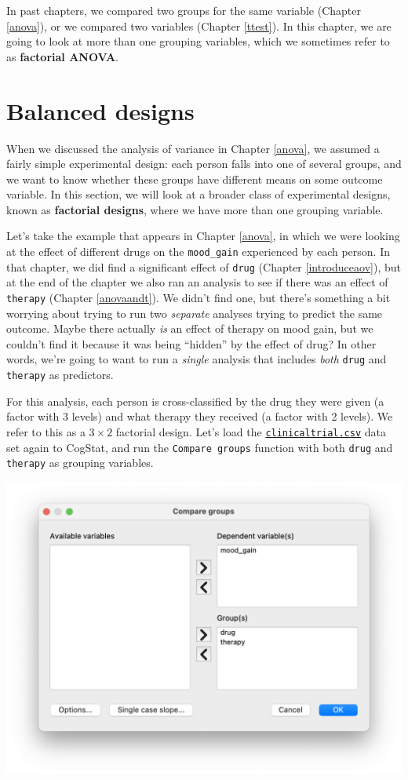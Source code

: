 \documentclass[
]{book}
\theoremstyle{definition}
\theoremstyle{definition}
\theoremstyle{definition}
\theoremstyle{definition}
\theoremstyle{remark}
\begin{document}
In past chapters, we compared two groups for the same variable (Chapter \ref{anova}), or we compared two variables (Chapter \ref{ttest}). In this chapter, we are going to look at more than one grouping variables, which we sometimes refer to as \textbf{factorial ANOVA}.

\hypertarget{factorialanovasimple}{%
\section{Balanced designs}\label{factorialanovasimple}}

When we discussed the analysis of variance in Chapter \ref{anova}, we assumed a fairly simple experimental design: each person falls into one of several groups, and we want to know whether these groups have different means on some outcome variable. In this section, we will look at a broader class of experimental designs, known as \textbf{factorial designs}, where we have more than one grouping variable.

Let's take the example that appears in Chapter \ref{anova}, in which we were looking at the effect of different drugs on the \texttt{mood\_gain} experienced by each person. In that chapter, we did find a significant effect of \texttt{drug} (Chapter \ref{introduceaov}), but at the end of the chapter we also ran an analysis to see if there was an effect of \texttt{therapy} (Chapter \ref{anovaandt}). We didn't find one, but there's something a bit worrying about trying to run two \emph{separate} analyses trying to predict the same outcome. Maybe there actually \emph{is} an effect of therapy on mood gain, but we couldn't find it because it was being ``hidden'' by the effect of drug? In other words, we're going to want to run a \emph{single} analysis that includes \emph{both} \texttt{drug} and \texttt{therapy} as predictors.

For this analysis, each person is cross-classified by the drug they were given (a factor with 3 levels) and what therapy they received (a factor with 2 levels). We refer to this as a \(3 \times 2\) factorial design. Let's load the \href{resources/data/clinicaltrial.csv}{\texttt{clinicaltrial.csv}} data set again to CogStat, and run the \texttt{Compare\ groups} function with both \texttt{drug} and \texttt{therapy} as grouping variables.

\begin{center}\includegraphics[width=0.66\linewidth]{resources/image/cogstatcompareclinanova2} \end{center}
\end{document}
